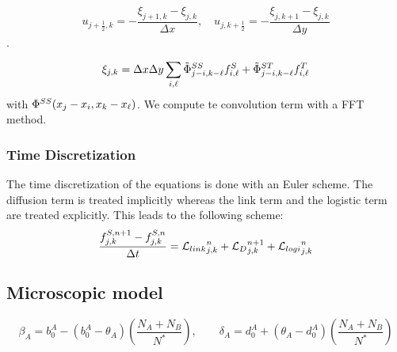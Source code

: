 $$u_{j+\frac{1}{2},k}=-\frac{\xi_{j+1,k}-\xi_{j,k}}{\Delta x}, \quad u_{j,k+\frac{1}{2}}=-\frac{\xi_{j,k+1}-\xi_{j,k}}{\Delta y}$$.

$$ \xi_{j,k}=\Delta x \Delta y \sum_{i,{\ell}} \tilde{\Phi}^{SS}_{j-i,k-{\ell}} f^{S}_{i,{\ell}}+
\tilde{\Phi}^{ST}_{j-i,k-{\ell}} f^{T}_{i,{\ell}} $$
with ${\Phi}^{SS}(x_j-x_i,x_k-x_{{\ell}})$. We compute te convolution term with a FFT method.
% 


\subsubsection{Time Discretization}

The time discretization of the equations is done with an Euler scheme. The diffusion term is treated implicitly whereas the link term and the logistic term are treated explicitly. This leads to the following scheme:
\begin{equation}
	\frac{f_{j,k}^{S,n+1}-f_{j,k}^{S,n}}{\Delta t}={\mathcal{L}_{link}}_{j,k}^n+{\mathcal{L}_{D}}_{j,k}^{n+1}+{\mathcal{L}_{logi}}_{j,k}^n
\end{equation}
\subsection{Microscopic model}

\begin{equation}
\beta_{A}=b_{0}^{A}-(b_{0}^{A}-\theta_{A})\left(\frac{N_A+N_B}{N^{*}}\right), \quad\quad \delta_{A}=d_{0}^{A}+(\theta_{A}-d_{0}^{A})\left(\frac{N_A+N_B}{N^{*}}\right)
\end{equation}


